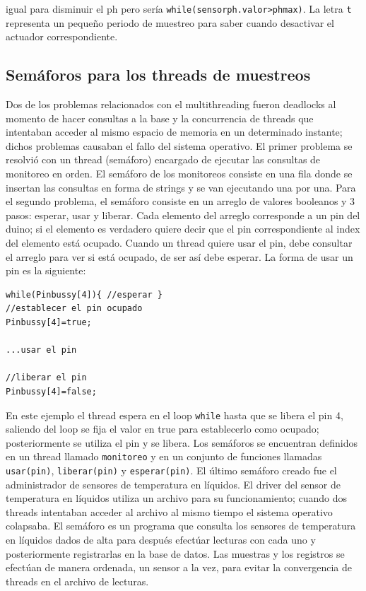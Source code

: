 \documentclass[10pt,twocolumn]{article}
\begin{document}
igual para disminuir el ph pero ser\'ia \verb|while(sensorph.valor>phmax)|. La letra \verb|t| representa un peque\~no periodo de muestreo para saber cuando desactivar 
el actuador correspondiente.

\subsection{Sem\'aforos para los threads de muestreos}
Dos de los problemas relacionados con el multithreading fueron deadlocks al momento de hacer consultas a la base y la concurrencia de threads que intentaban acceder al 
mismo espacio de memoria en un determinado instante; dichos problemas causaban el fallo del sistema operativo. El primer problema se resolvi\'o con un 
thread (sem\'aforo)
encargado de ejecutar las consultas de monitoreo en orden. El sem\'aforo de los monitoreos consiste en una fila donde se insertan las 
consultas en forma de strings y se van 
ejecutando una por una. Para el segundo problema, el sem\'aforo consiste en un arreglo de valores booleanos y 3 pasos: esperar, usar y liberar. Cada elemento del 
arreglo 
corresponde a un pin del duino; si el elemento es verdadero quiere decir que el pin correspondiente al index del elemento est\'a ocupado. Cuando un thread quiere usar 
el pin, debe consultar el arreglo para ver si est\'a ocupado, de ser as\'i debe esperar. La forma de usar un pin es la siguiente:

\begin{verbatim}
while(Pinbussy[4]){ //esperar }
//establecer el pin ocupado
Pinbussy[4]=true;

...usar el pin

//liberar el pin
Pinbussy[4]=false;
\end{verbatim}

En este ejemplo el thread espera en el loop \verb|while| hasta que se libera el pin 4, saliendo del loop se fija el valor en true para establecerlo como ocupado; 
posteriormente se utiliza el pin y se libera. Los sem\'aforos se encuentran 
definidos en un thread llamado \verb|monitoreo| y en un conjunto de funciones llamadas \verb|usar(pin)|, \verb|liberar(pin)| y \verb|esperar(pin)|. El \'ultimo sem\'aforo 
creado fue el administrador de sensores de temperatura en l\'iquidos. El driver del sensor de temperatura en l\'iquidos utiliza un archivo para su funcionamiento; cuando 
dos threads intentaban acceder al archivo al mismo tiempo el sistema operativo colapsaba. El sem\'aforo es un programa que consulta los
sensores de temperatura en l\'iquidos dados de alta para despu\'es efect\'uar lecturas con cada uno y posteriormente registrarlas 
en la base de datos. Las muestras y los registros se efect\'uan de manera ordenada, un sensor a la vez, para evitar la convergencia de threads en el archivo de lecturas.
\end{document}
